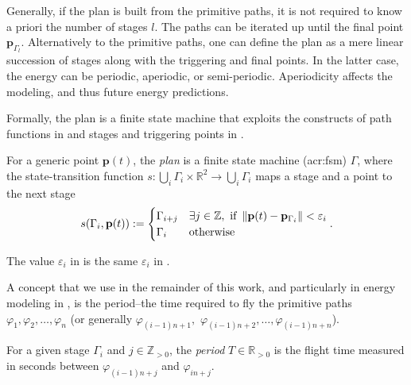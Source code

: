 Generally, if the plan is built from the primitive paths, it is not required to know a priori the number of stages $l$. The paths can be iterated up until the final point $\mathbf{p}_{\Gamma_l}$. 
Alternatively to the primitive paths, one can define the plan as a mere linear succession of stages along with the triggering and final points. In the latter case, the energy can be periodic, aperiodic, or semi-periodic. Aperiodicity affects the modeling, and thus future energy predictions. 

Formally, the plan is a finite state machine that exploits the constructs of path functions in  and stages and triggering points in .

\begin{defn}[Plan]
  \label{def:plan}
  For a generic point $\mathbf{p}(t)$, the \emph{plan} is a finite state machine (\Gls{acr:fsm}) $\Gamma$, where the state-transition function $s:\bigcup_i{\Gamma_i}\times\mathbb{R}^2\rightarrow\bigcup_i{\Gamma_i}$ maps a stage and a point to the next stage
  \begin{equation*}s(\Gamma_i,\mathbf{p}(t)):=\begin{cases}
    \Gamma_{i+j} & \exists j\in\mathbb{Z},\text{ if }\left\lVert\mathbf{p}(t)-\mathbf{p}_{\Gamma_i}\right\rVert<\varepsilon_i\\
    \Gamma_i & \text{otherwise}
  \end{cases}.\end{equation*}
\end{defn}

The value $\varepsilon_i$ in  is the same $\varepsilon_i$ in . 

A concept that we use in the remainder of this work, and particularly in energy modeling in , is the period--the time required to fly the primitive paths $\varphi_1,\varphi_2,\dots,\varphi_n$ (or generally $\varphi_{(i-1)n+1},$ $\varphi_{(i-1)n+2},\dots,\varphi_{(i-1)n+n}$). 

\begin{defn}[Period]
  \label{def:period}
  For a given stage $\Gamma_i$ and $j\in\mathbb{Z}_{>0}$, the \emph{period} $T\in\mathbb{R}_{> 0}$ is the flight time measured in seconds between $\varphi_{(i-1)n+j}$ and $\varphi_{in+j}$.
\end{defn} 
  
